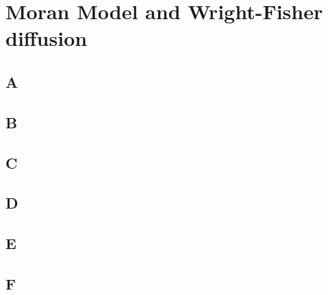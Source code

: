 \documentclass{article}
\begin{document}
\section{Moran Model and Wright-Fisher diffusion}

\subsection{A}

\subsection{B}

\subsection{C}

\subsection{D}

\subsection{E}

\subsection{F}
\end{document}
